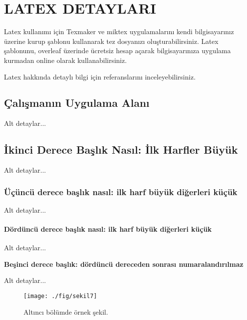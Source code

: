 \chapter{LATEX DETAYLARI}\label{ch:ch6}
Latex kullanımı için Texmaker ve miktex uygulamalarını kendi bilgisayarınız üzerine kurup şablonu kullanarak tez dosyanızı oluşturabilirsiniz. Latex şablonunu, overleaf üzerinde ücretsiz hesap açarak bilgisayarınıza uygulama kurmadan online olarak kullanabilirsiniz. 

Latex hakkında detaylı bilgi için \cite{latexKitap,bibtexWebReferans,latexOrnek} referanslarını inceleyebilirsiniz.

\section{\c{C}al\i \c{s}man\i n Uygulama Alan{\i}}

Alt detaylar...

\section{\.Ikinci Derece Ba\c{s}l\i k Nas\i l: \.Ilk Harfler B\"uy\"uk}

Alt detaylar...

\subsection{\"U\c{c}\"unc\"u derece ba\c{s}l\i k nas\i l: ilk harf b\"uy\"uk di\u{g}erleri k\"u\c{c}\"uk}

Alt detaylar...

\subsubsection{D\"ord\"unc\"u derece ba\c{s}l\i k nas\i l: ilk harf b\"uy\"uk di\u{g}erleri k\"u\c{c}\"uk}

Alt detaylar...

{\bf Be\c{s}inci derece ba\c{s}l\i k: d\"ord\"unc\"u dereceden sonras{\i} numaraland\i r\i lmaz}

Alt detaylar...

\begin{figure}[ht]
 \centering
 \texttt{[image: ./fig/sekil7]}
 \caption{Alt\i nc{\i} b\"ol\"umde \"ornek \c{s}ekil.}
 \label{fig:6-1}
\end{figure}

